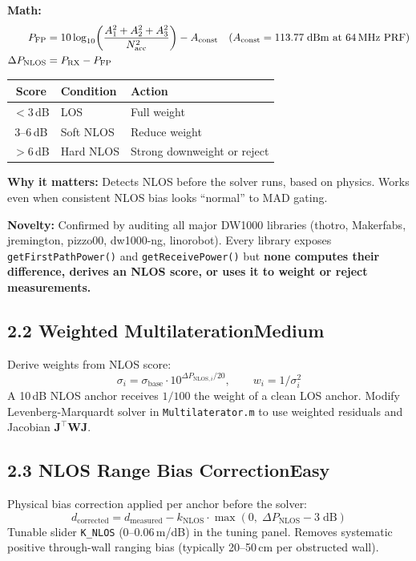 \documentclass[11pt,a4paper]{article}
\newcommand{\mat}[1]{\mathbf{#1}}
\newcommand{\dif}[1]{\texorpdfstring{\hfill#1}{}}
\newcommand{\easy}{\textcolor{dkgreen}{\textbf{Easy}}}
\newcommand{\medium}{\textcolor{dkorange}{\textbf{Medium}}}
\begin{document}
\textbf{Math:}
\begin{align*}
P_\text{FP} &= 10\log_{10}\!\left(\frac{A_1^2+A_2^2+A_3^2}{N_\text{acc}^2}\right) - A_\text{const}
\quad (A_\text{const} = 113.77\;\text{dBm at 64\,MHz PRF}) \\
\Delta P_\text{NLOS} &= P_\text{RX} - P_\text{FP}
\end{align*}

\begin{center}
\begin{tabular}{cll}
\toprule
\textbf{Score} & \textbf{Condition} & \textbf{Action} \\
\midrule
$<3$\,dB & LOS & Full weight \\
3--6\,dB & Soft NLOS & Reduce weight \\
$>6$\,dB & Hard NLOS & Strong downweight or reject \\
\bottomrule
\end{tabular}
\end{center}

\textbf{Why it matters:} Detects NLOS before the solver runs, based on physics. Works even when consistent NLOS bias looks ``normal'' to MAD gating.

\textbf{Novelty:} Confirmed by auditing all major DW1000 libraries (thotro, Makerfabs, jremington, pizzo00, dw1000-ng, linorobot). Every library exposes \texttt{getFirstPathPower()} and \texttt{getReceivePower()} but \textbf{none computes their difference, derives an NLOS score, or uses it to weight or reject measurements.}

\subsection{2.2 Weighted Multilateration\dif{\medium}}

Derive weights from NLOS score:
\[
\sigma_i = \sigma_\text{base} \cdot 10^{\Delta P_{\text{NLOS},i}/20}, \qquad w_i = 1/\sigma_i^2
\]
A 10\,dB NLOS anchor receives $1/100$ the weight of a clean LOS anchor. Modify Levenberg-Marquardt solver in \texttt{Multilaterator.m} to use weighted residuals and Jacobian $\mat{J}^\top\mat{W}\mat{J}$.

\subsection{2.3 NLOS Range Bias Correction\dif{\easy}}

Physical bias correction applied per anchor before the solver:
\[
d_\text{corrected} = d_\text{measured} - k_\text{NLOS} \cdot \max(0,\; \Delta P_\text{NLOS} - 3\;\text{dB})
\]
Tunable slider \texttt{K\_NLOS} (0--0.06\,m/dB) in the tuning panel. Removes systematic positive through-wall ranging bias (typically 20--50\,cm per obstructed wall).
\end{document}
